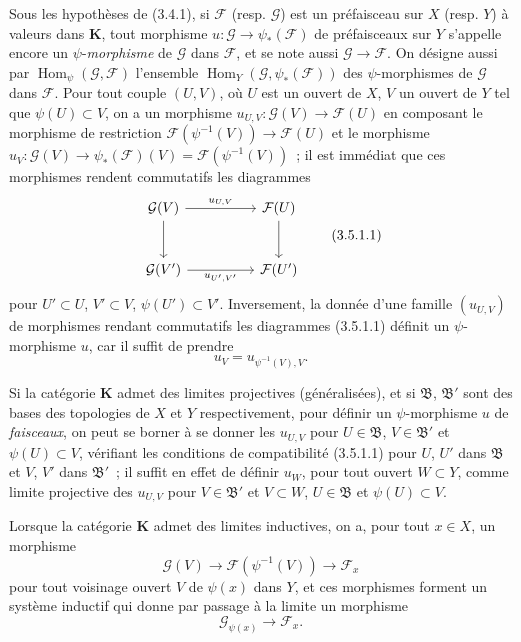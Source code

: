 \begin{env}[3.5.1]
\label{0.3.5.1-fr}
Sous les hypothèses de (3.4.1), si $\mathcal{F}$ (resp. $\mathcal{G}$) est un
préfaisceau sur $X$ (resp. $Y$) à valeurs dans $\boldsymbol{K}$, tout morphisme
$u:\mathcal{G}\to\psi_*(\mathcal{F})$ de préfaisceaux sur $Y$ s'appelle encore
un $\psi$-\emph{morphisme} de $\mathcal{G}$ dans $\mathcal{F}$, et se note
aussi $\mathcal{G}\to\mathcal{F}$. On désigne aussi par
$\operatorname{Hom}_\psi(\mathcal{G},\mathcal{F})$ l'ensemble
$\operatorname{Hom}_Y(\mathcal{G},\psi_*(\mathcal{F}))$ des
$\psi$-morphismes de $\mathcal{G}$ dans $\mathcal{F}$.
Pour tout couple $(U,V)$, où $U$ est un ouvert de $X$, $V$ un ouvert de $Y$
tel que $\psi(U)\subset V$, on a un morphisme
$u_{U,V}:\mathcal{G}(V)\to\mathcal{F}(U)$ en composant le morphisme de
restriction
$\mathcal{F}(\psi^{-1}(V))\to\mathcal{F}(U)$ et le morphisme
$u_V:\mathcal{G}(V)\to\psi_*(\mathcal{F})(V)=\mathcal{F}(\psi^{-1}(V))$~; il
est immédiat que ces morphismes rendent commutatifs les diagrammes
\begin{equation*}
\begin{tikzcd}[column sep=huge,row sep=large]
\mathcal{G}(V) \arrow[r,"u_{U,V}"] \arrow[d]
  & \mathcal{F}(U) \arrow[d] \\
\mathcal{G}(V') \arrow[r,"u_{U',V'}"']
  & \mathcal{F}(U')
\end{tikzcd}
\tag{3.5.1.1}\label{0.3.5.1.1-fr}
\end{equation*}
pour $U'\subset U$, $V'\subset V$, $\psi(U')\subset V'$. Inversement, la
donnée d'une famille $(u_{U,V})$ de morphismes rendant commutatifs les
diagrammes (3.5.1.1) définit un $\psi$-morphisme $u$, car il suffit de prendre
\[
  u_V=u_{\psi^{-1}(V),V}.
\]


Si la catégorie $\boldsymbol{K}$ admet des limites projectives (généralisées), et
si $\mathfrak{B}$, $\mathfrak{B}'$ sont des bases des topologies de $X$ et
$Y$ respectivement, pour définir un $\psi$-morphisme $u$ de \emph{faisceaux},
on peut se borner à se donner les $u_{U,V}$ pour
$U\in\mathfrak{B}$, $V\in\mathfrak{B}'$ et $\psi(U)\subset V$, vérifiant les
conditions de compatibilité (3.5.1.1) pour $U$, $U'$ dans $\mathfrak{B}$ et
$V$, $V'$ dans $\mathfrak{B}'$~; il suffit en effet de définir $u_W$, pour
tout ouvert $W\subset Y$, comme limite projective des $u_{U,V}$ pour
$V\in\mathfrak{B}'$ et $V\subset W$, $U\in\mathfrak{B}$ et
$\psi(U)\subset V$.

Lorsque la catégorie $\boldsymbol{K}$ admet des limites inductives, on a, pour
tout $x\in X$, un morphisme
\[
  \mathcal{G}(V)\to\mathcal{F}(\psi^{-1}(V))\to\mathcal{F}_x
\]
pour tout voisinage ouvert $V$ de $\psi(x)$ dans $Y$, et ces morphismes
forment un système inductif qui donne par passage à la limite un morphisme
\[
  \mathcal{G}_{\psi(x)}\to\mathcal{F}_x.
\]
\end{env}

